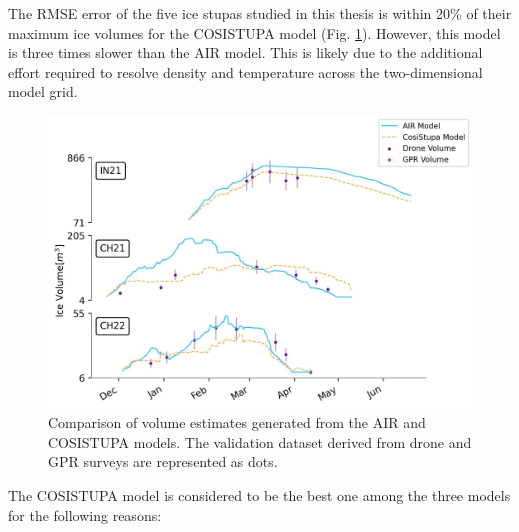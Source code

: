 The \ac{RMSE} error of the five ice stupas studied in this thesis is within 20\% of their maximum ice volumes
for the COSISTUPA model (Fig. \ref{fig:Cosistupa}).  However, this model is three times slower than the \ac{AIR} model.
This is likely due to the additional effort required to resolve density and temperature across the two-dimensional model grid.

\begin{figure}[t]
	\centering
	\includegraphics[width=\textwidth]{figs/model_compare.jpg}

	\caption{Comparison of volume estimates generated from the \ac{AIR} and COSISTUPA models. The validation
  dataset derived from drone and \ac{GPR} surveys are represented as dots.}

	\label{fig:Cosistupa}
\end{figure}

The COSISTUPA model is considered to be the best one among the three models for the following reasons:

